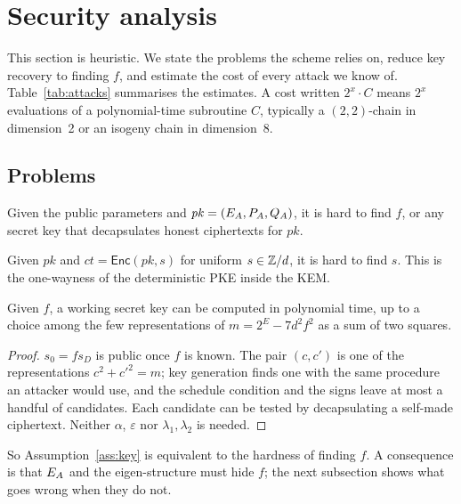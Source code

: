 \section{Security analysis}\label{sec:security}

This section is heuristic. We state the problems the scheme relies on,
reduce key recovery to finding $f$, and estimate the cost of every attack we
know of. Table~\ref{tab:attacks} summarises the estimates. A cost written
$2^x\cdot C$ means $2^x$ evaluations of a polynomial-time subroutine $C$,
typically a $(2,2)$-chain in dimension~2 or an isogeny chain in dimension~8.

\subsection{Problems}

\begin{assumption}\label{ass:key}
Given the public parameters and $\mathit{pk}=(E_A,P_A,Q_A)$, it is hard to
find $f$, or any secret key that decapsulates honest ciphertexts for
$\mathit{pk}$.
\end{assumption}

\begin{assumption}\label{ass:msg}
Given $\mathit{pk}$ and $\mathit{ct}=\textsf{Enc}(\mathit{pk},s)$ for uniform
$s\in\mathbb{Z}/d$, it is hard to find $s$. This is the one-wayness of the
deterministic PKE inside the KEM.
\end{assumption}

\begin{lemma}\label{lem:fiskey}
Given $f$, a working secret key can be computed in polynomial time, up to a
choice among the few representations of $m=2^E-7d^2f^2$ as a sum of two
squares.
\end{lemma}

\begin{proof}
$s_0=fs_D$ is public once $f$ is known. The pair $(c,c')$ is one of the
representations $c^2+c'^2=m$; key generation finds one with the same
procedure an attacker would use, and the schedule condition and the signs
leave at most a handful of candidates. Each candidate can be tested by
decapsulating a self-made ciphertext. Neither $\alpha$, $\varepsilon$ nor
$\lambda_1,\lambda_2$ is needed.
\end{proof}

So Assumption~\ref{ass:key} is equivalent to the hardness of finding $f$. A
consequence is that $E_A$ and the eigen-structure must hide $f$; the next
subsection shows what goes wrong when they do not.

